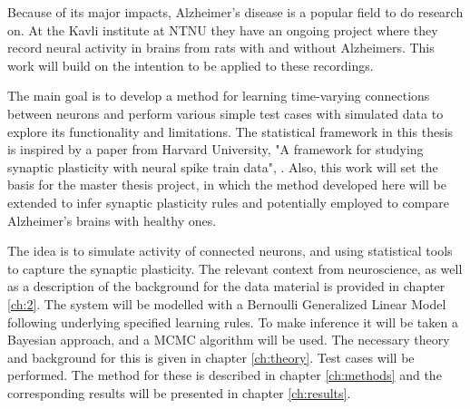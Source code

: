 Because of its major impacts, Alzheimer's disease is a popular field to do research on. At the Kavli institute at NTNU they have an ongoing project where they record neural activity in brains from rats with and without Alzheimers. This work will build on the intention to be applied to these recordings.


The main goal is to develop a method for learning time-varying connections between neurons and perform various simple test cases with simulated data to explore its functionality and limitations. The statistical framework in this thesis is inspired by a paper from Harvard University, "A framework for studying synaptic plasticity with neural spike train data", \cite{Linderman}. Also, this work will set the basis for the master thesis project, in which the method developed here will be extended to infer synaptic plasticity rules and potentially employed to compare Alzheimer's brains with healthy ones.

The idea is to simulate activity of connected neurons, and using statistical tools to capture the synaptic plasticity. The relevant context from neuroscience, as well as a description of the background for the data material is provided in chapter \ref{ch:2}. The system will be modelled with a Bernoulli Generalized Linear Model following underlying specified learning rules. To make inference it will be taken a Bayesian approach, and a MCMC algorithm will be used. The necessary theory and background for this is given in chapter \ref{ch:theory}. Test cases will be performed. The method for these is described in chapter \ref{ch:methods} and the corresponding results will be presented in chapter \ref{ch:results}.

